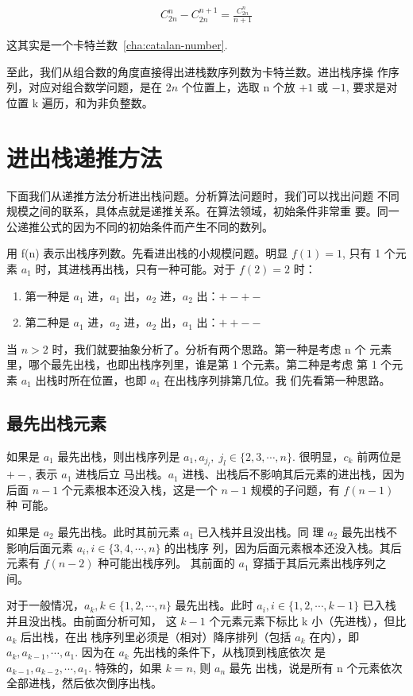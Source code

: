\begin{align*}
  C_{2n}^n - C_{2n}^{n+1} = \frac{C_{2n}^n}{n+1}
\end{align*}

这其实是一个卡特兰数~\ref{cha:catalan-number}.

至此，我们从组合数的角度直接得出进栈数序列数为卡特兰数。进出栈序操
作序列，对应对组合数学问题，是在 $2n$ 个位置上，选取 n 个放 $+1$ 或
$-1$, 要求是对位置 k 遍历，和为非负整数。

\section{进出栈递推方法}

下面我们从递推方法分析进出栈问题。分析算法问题时，我们可以找出问题
不同规模之间的联系，具体点就是递推关系。在算法领域，初始条件非常重
要。同一公递推公式的因为不同的初始条件而产生不同的数列。

用 f(n) 表示出栈序列数。先看进出栈的小规模问题。明显 $f(1) = 1$,
只有 1 个元素 $a_1$ 时，其进栈再出栈，只有一种可能。对于 $f(2) =
2$ 时：

\begin{enumerate}
\item 第一种是 $a_1$ 进，$a_1$ 出，$a_2$ 进，$a_2$ 出：$+-+-$
\item 第二种是 $a_1$ 进，$a_2$ 进，$a_2$ 出，$a_1$ 出：$++--$
\end{enumerate}

当 $n > 2$ 时，我们就要抽象分析了。分析有两个思路。第一种是考虑 n 个
元素里，哪个最先出栈，也即出栈序列里，谁是第 1 个元素。第二种是考虑
第 1 个元素 $a_1$ 出栈时所在位置，也即 $a_1$ 在出栈序列排第几位。我
们先看第一种思路。

\subsection{最先出栈元素}

如果是 $a_1$ 最先出栈，则出栈序列是 $a_1, a_{j_l},\; j_l \in
\{2,3,\cdots,n\}$. 很明显，$c_k$ 前两位是 $+-$, 表示 $a_1$ 进栈后立
马出栈。$a_1$ 进栈、出栈后不影响其后元素的进出栈，因为后面 $n - 1$
个元素根本还没入栈，这是一个 $n - 1$ 规模的子问题，有 $f(n - 1)$ 种
可能。

如果是 $a_2$ 最先出栈。此时其前元素 $a_1$ 已入栈并且没出栈。同
理 $a_2$ 最先出栈不影响后面元素 $a_i, i \in \{3,4,\cdots,n\}$ 的出栈序
列，因为后面元素根本还没入栈。其后元素有 $f(n - 2)$ 种可能出栈序列。
其前面的 $a_1$ 穿插于其后元素出栈序列之间。

对于一般情况，$a_k, k \in \{1,2,\cdots,n\}$ 最先出栈。此时
$a_i, i \in \{1,2,\cdots,k-1\}$ 已入栈并且没出栈。由前面分析可知，
这 $k - 1$ 个元素元素下标比 k 小（先进栈），但比 $a_k$ 后出栈，在出
栈序列里必须是（相对）降序排列（包括 $a_k$ 在内），即 $a_k,
a_{k-1},\cdots,a_1$. 因为在 $a_k$ 先出栈的条件下，从栈顶到栈底依次
是 $a_{k-1},a_{k-2},\cdots,a_1$. 特殊的，如果 $k = n$, 则 $a_n$ 最先
出栈，说是所有 n 个元素依次全部进栈，然后依次倒序出栈。


